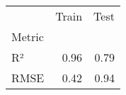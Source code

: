 \begin{tabular}{lrr}
\toprule
 & Train & Test \\
Metric &  &  \\
\midrule
R² & 0.96 & 0.79 \\
RMSE & 0.42 & 0.94 \\
\bottomrule
\end{tabular}
